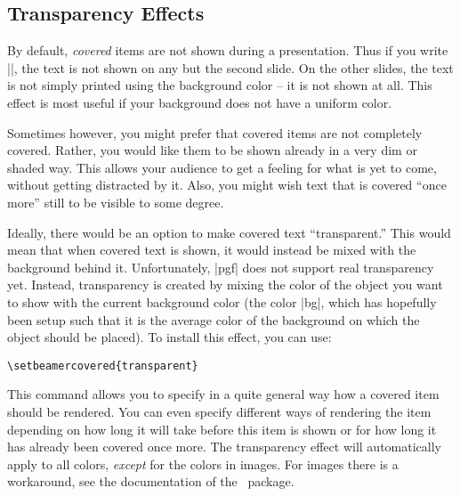 \subsection{Transparency Effects}
\label{section-transparent}

By default, \emph{covered} items are not shown during a
presentation. Thus if you write ||, the text
is not shown on any but the second slide. On the other slides, the text
is not simply printed using the background color -- it is not shown at
all. This effect is most useful if your background does not have a
uniform color.

Sometimes however, you might prefer that covered items are not
completely covered. Rather, you would like them to be shown already in
a very dim or shaded way. This allows your audience to get a feeling
for what is yet to come, without getting distracted by it. Also, you
might wish text that is covered ``once more'' still to be visible to
some degree.

Ideally, there would be an option to make covered text
``transparent.'' This would mean that when covered text is shown, it
would instead be mixed with the background behind it. Unfortunately,
|pgf| does not support real transparency yet. Instead, transparency is
created by mixing the color of the object you want to show with the
current background color (the color |bg|, which has hopefully been
setup such that it is the average color of the background on which the
object should be placed). To install this effect, you can use:
\begin{verbatim}
\setbeamercovered{transparent}
\end{verbatim}
This command allows you to specify in a quite general way how a
covered item should be rendered. You can even specify different ways
of rendering the item depending on how long it will take before this
item is shown or for how long it has already been covered once
more. The transparency effect will automatically apply to all colors,
\emph{except} for the colors in images. For images there is a
workaround, see the documentation of the \pgfname\ package.

